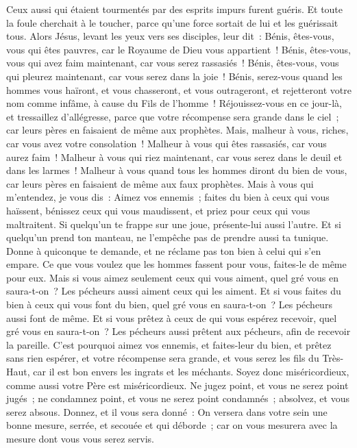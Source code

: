 \begin{multicols}{2}
Ceux aussi qui étaient tourmentés par des esprits impurs furent guéris.
Et toute la foule cherchait à le toucher, parce qu'une force sortait de lui et les guérissait tous.
Alors Jésus, levant les yeux vers ses disciples, leur dit~: Bénis, êtes-vous, vous qui êtes pauvres, car le Royaume de Dieu vous appartient~!
Bénis, êtes-vous, vous qui avez faim maintenant, car vous serez rassasiés~! Bénis, êtes-vous, vous qui pleurez maintenant, car vous serez dans la joie~!
Bénis, serez-vous quand les hommes vous haïront, et vous chasseront, et vous outrageront, et rejetteront votre nom comme infâme, à cause du Fils de l'homme~!
Réjouissez-vous en ce jour-là, et tressaillez d'allégresse, parce que votre récompense sera grande dans le ciel~; car leurs pères en faisaient de même aux prophètes.
Mais, malheur à vous, riches, car vous avez votre consolation~!
Malheur à vous qui êtes rassasiés, car vous aurez faim~! Malheur à vous qui riez maintenant, car vous serez dans le deuil et dans les larmes~!
Malheur à vous quand tous les hommes diront du bien de vous, car leurs pères en faisaient de même aux faux prophètes.
Mais à vous qui m'entendez, je vous dis~: Aimez vos ennemis~; faites du bien à ceux qui vous haïssent,
bénissez ceux qui vous maudissent, et priez pour ceux qui vous maltraitent.
Si quelqu'un te frappe sur une joue, présente-lui aussi l'autre. Et si quelqu'un prend ton manteau, ne l'empêche pas de prendre aussi ta tunique.
Donne à quiconque te demande, et ne réclame pas ton bien à celui qui s'en empare.
Ce que vous voulez que les hommes fassent pour vous, faites-le de même pour eux.
Mais si vous aimez seulement ceux qui vous aiment, quel gré vous en saura-t-on~? Les pécheurs aussi aiment ceux qui les aiment.
Et si vous faites du bien à ceux qui vous font du bien, quel gré vous en saura-t-on~? Les pécheurs aussi font de même.
Et si vous prêtez à ceux de qui vous espérez recevoir, quel gré vous en saura-t-on~? Les pécheurs aussi prêtent aux pécheurs, afin de recevoir la pareille.
C'est pourquoi aimez vos ennemis, et faites-leur du bien, et prêtez sans rien espérer, et votre récompense sera grande, et vous serez les fils du Très-Haut, car il est bon envers les ingrats et les méchants.
Soyez donc miséricordieux, comme aussi votre Père est miséricordieux.
Ne jugez point, et vous ne serez point jugés~; ne condamnez point, et vous ne serez point condamnés~; absolvez, et vous serez absous.
Donnez, et il vous sera donné~: On versera dans votre sein une bonne mesure, serrée, et secouée et qui déborde~; car on vous mesurera avec la mesure dont vous vous serez servis.

\end{multicols}
